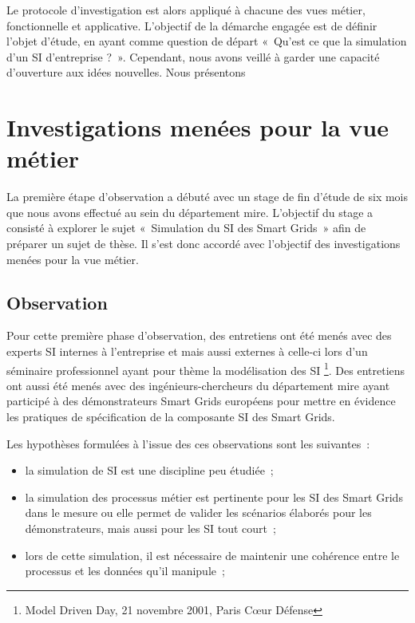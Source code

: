 	Le protocole d'investigation est alors appliqué à chacune des vues métier, 
fonctionnelle et applicative. L'objectif de la démarche engagée est de définir 
l'objet d'étude, en ayant comme question de départ «~Qu'est ce que la simulation 
d'un SI d'entreprise ?~». Cependant, nous avons veillé à garder une capacité 
d'ouverture aux idées nouvelles. Nous présentons
	
		\section{Investigations menées pour la vue métier}
		\label{sec:exploration_metier}
			La première étape d'observation a débuté avec un stage de fin d'étude de six 
mois que nous avons effectué au sein du département \gls{mire}. L'objectif du 
stage a consisté à explorer le sujet «~Simulation du SI des Smart Grids~» afin 
de préparer un sujet de thèse. Il s'est donc accordé avec l'objectif des 
investigations menées pour la vue métier.
			
			\subsection{Observation}
				Pour cette première phase d'observation, des entretiens ont été menés avec 
des experts SI internes à l'entreprise et mais aussi externes à celle-ci lors 
d'un séminaire professionnel ayant pour thème la modélisation des SI \footnote{Model Driven Day, 21 novembre 2001, Paris 
Cœur Défense}. Des entretiens ont aussi été menés avec des ingénieurs-chercheurs 
du département \gls{mire} ayant participé à des démonstrateurs Smart Grids 
européens pour mettre en évidence les pratiques de spécification de la 
composante SI des Smart Grids. 

				Les hypothèses formulées à l'issue des ces observations sont les suivantes~:
				\begin{itemize}
					\item la simulation de SI est une discipline peu étudiée~;
					\item la simulation des processus métier est pertinente pour les SI des 
Smart Grids dans le mesure ou elle permet de valider les scénarios élaborés pour 
les démonstrateurs, mais aussi pour les SI tout court~;
					\item lors de cette simulation, il est nécessaire de maintenir une 
cohérence entre le processus et les données qu'il manipule~;
				\end{itemize}
		
